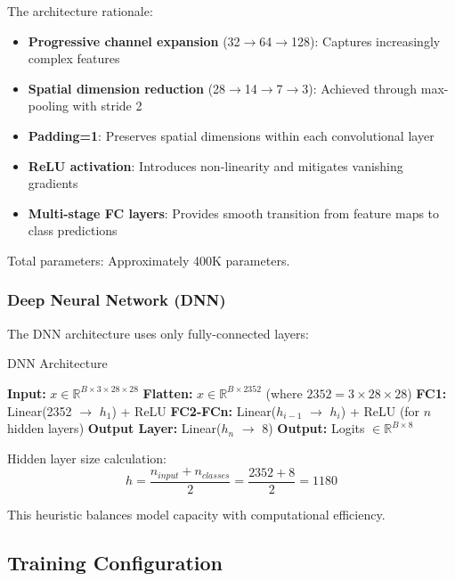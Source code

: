 \documentclass[runningheads]{llncs}
\begin{document}
The architecture rationale:
\begin{itemize}
    \item \textbf{Progressive channel expansion} (32$\rightarrow$64$\rightarrow$128): Captures increasingly complex features
    \item \textbf{Spatial dimension reduction} (28$\rightarrow$14$\rightarrow$7$\rightarrow$3): Achieved through max-pooling with stride 2
    \item \textbf{Padding=1}: Preserves spatial dimensions within each convolutional layer
    \item \textbf{ReLU activation}: Introduces non-linearity and mitigates vanishing gradients
    \item \textbf{Multi-stage FC layers}: Provides smooth transition from feature maps to class predictions
\end{itemize}

Total parameters: Approximately 400K parameters.

\subsubsection{Deep Neural Network (DNN)}

The DNN architecture uses only fully-connected layers:

\begin{algorithm}
\caption{DNN Architecture}
\begin{algorithmic}[1]
\STATE \textbf{Input:} $x \in \mathbb{R}^{B \times 3 \times 28 \times 28}$
\STATE \textbf{Flatten:} $x \in \mathbb{R}^{B \times 2352}$ (where $2352 = 3 \times 28 \times 28$)
\STATE \textbf{FC1:} Linear(2352 $\rightarrow$ $h_1$) + ReLU
\STATE \textbf{FC2-FCn:} Linear($h_{i-1}$ $\rightarrow$ $h_i$) + ReLU (for $n$ hidden layers)
\STATE \textbf{Output Layer:} Linear($h_n$ $\rightarrow$ 8)
\STATE \textbf{Output:} Logits $\in \mathbb{R}^{B \times 8}$
\end{algorithmic}
\end{algorithm}

Hidden layer size calculation:
\begin{equation}
h = \frac{n_{input} + n_{classes}}{2} = \frac{2352 + 8}{2} = 1180
\end{equation}

This heuristic balances model capacity with computational efficiency.

\subsection{Training Configuration}
\end{document}
